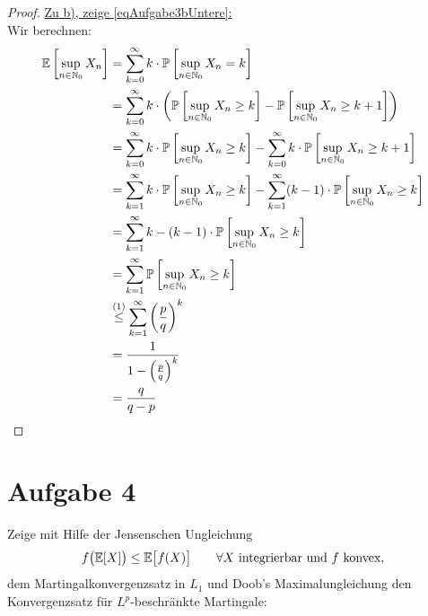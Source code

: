 \documentclass[12pt,a4paper]{article}
\begin{document}
\begin{proof}
\underline{Zu b), zeige \eqref{eqAufgabe3bUntere}:}\\
Wir berechnen:
\begin{align*}
	\mathbb{E}\left[\sup\limits_{n\in \mathbb{N}_0}X_n\right] 
	&= \sum\limits_{k=0}^\infty k\cdot \mathbb{P}\left[\sup\limits_{n\in \mathbb{N}_0}X_n = k\right] \\
	&= \sum\limits_{k=0}^\infty k\cdot\left( \mathbb{P}\left[\sup\limits_{n\in \mathbb{N}_0}X_n \geq k\right] - \mathbb{P}\left[\sup\limits_{n\in \mathbb{N}_0}X_n \geq k+1\right]\right)\\
	&= \sum\limits_{k=0}^\infty k\cdot\mathbb{P}\left[\sup\limits_{n\in \mathbb{N}_0}X_n \geq k\right] - \sum\limits_{k=0}^\infty k \cdot \mathbb{P}\left[\sup\limits_{n\in \mathbb{N}_0}X_n \geq k+1\right]\\
	&= \sum\limits_{k=1}^\infty k\cdot\mathbb{P}\left[\sup\limits_{n\in \mathbb{N}_0}X_n \geq k\right] - \sum\limits_{k=1}^\infty (k-1) \cdot \mathbb{P}\left[\sup\limits_{n\in \mathbb{N}_0}X_n \geq k\right]\\
	&= \sum\limits_{k=1}^\infty k - (k-1) \cdot \mathbb{P}\left[\sup\limits_{n\in \mathbb{N}_0}X_n \geq k\right]\\
	&= \sum\limits_{k=1}^\infty \mathbb{P}\left[\sup\limits_{n\in \mathbb{N}_0}X_n \geq k\right]\\
	&\stackrel{(1)}{\leq}\sum\limits_{k=1}^\infty \left(\frac{p}{q}\right)^k\\
	&=\frac{1}{1-\left(\frac{p}{q}\right)^k} \\
	&= \frac{q}{q-p}
\end{align*}

\end{proof}

\section*{Aufgabe 4}
Zeige mit Hilfe der Jensenschen Ungleichung
\begin{align}\label{eqJensenscheUngleichung}
f\big(\mathbb{E}[X]\big)\leq\mathbb{E}\big[f(X)\big]\qquad\forall X\text{ integrierbar und $f$ konvex},
\end{align}
dem Martingalkonvergenzsatz in $L_1$ und Doob's Maximalungleichung den Konvergenzsatz für $L^p$-beschränkte Martingale:
\end{document}
